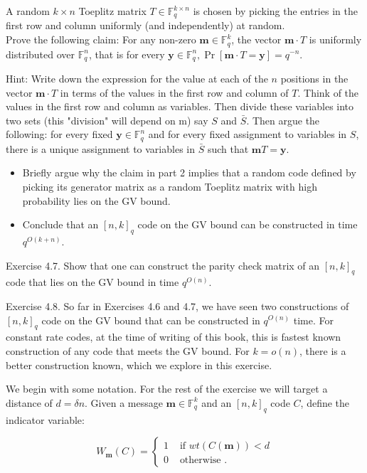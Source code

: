\documentclass[10pt]{article}
\begin{document}
A random $k \times n$ Toeplitz matrix $T \in \mathbb{F}_{q}^{k \times n}$ is chosen by picking the entries in the first row and column uniformly (and independently) at random.\\
Prove the following claim: For any non-zero $\mathbf{m} \in \mathbb{F}_{q}^{k}$, the vector $\mathbf{m} \cdot T$ is uniformly distributed over $\mathbb{F}_{q}^{n}$, that is for every $\mathbf{y} \in \mathbb{F}_{q}^{n}, \operatorname{Pr}[\mathbf{m} \cdot T=\mathbf{y}]=q^{-n}$.

Hint: Write down the expression for the value at each of the $n$ positions in the vector $\mathbf{m} \cdot T$ in terms of the values in the first row and column of $T$. Think of the values in the first row and column as variables. Then divide these variables into two sets (this "division" will depend on m) say $S$ and $\bar{S}$. Then argue the following: for every fixed $\mathbf{y} \in \mathbb{F}_{q}^{n}$ and for every fixed assignment to variables in $S$, there is a unique assignment to variables in $\bar{S}$ such that $\mathbf{m} T=\mathbf{y}$.

\begin{itemize}
  \item[3.] Briefly argue why the claim in part 2 implies that a random code defined by picking its generator matrix as a random Toeplitz matrix with high probability lies on the GV bound.
  \item[4.] Conclude that an $[n, k]_{q}$ code on the GV bound can be constructed in time $q^{O(k+n)}$.
\end{itemize}

Exercise 4.7. Show that one can construct the parity check matrix of an $[n, k]_{q}$ code that lies on the GV bound in time $q^{O(n)}$.

Exercise 4.8. So far in Exercises 4.6 and 4.7, we have seen two constructions of $[n, k]_{q}$ code on the GV bound that can be constructed in $q^{O(n)}$ time. For constant rate codes, at the time of writing of this book, this is fastest known construction of any code that meets the GV bound. For $k=o(n)$, there is a better construction known, which we explore in this exercise.

We begin with some notation. For the rest of the exercise we will target a distance of $d=\delta n$. Given a message $\mathbf{m} \in \mathbb{F}_{q}^{k}$ and an $[n, k]_{q}$ code $C$, define the indicator variable:

$$
W_{\mathbf{m}}(C)=\left\{\begin{array}{cc}
1 & \text { if } w t(C(\mathbf{m}))<d \\
0 & \text { otherwise } .
\end{array}\right.
$$
\end{document}
